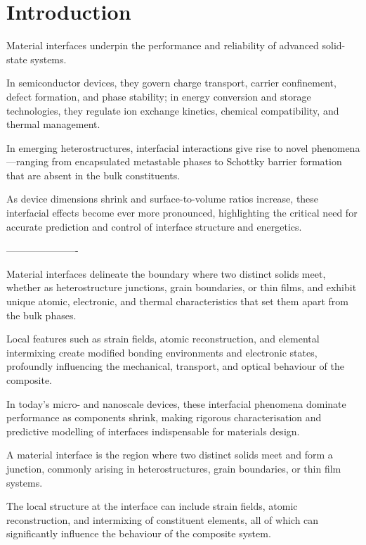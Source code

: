 \chapter{Introduction} \label{chapter:introduction}

\label{para:interface_importance} %

Material interfaces underpin the performance and reliability of advanced solid-state systems.

In semiconductor devices, they govern charge transport, carrier confinement, defect formation, and phase stability; in energy conversion and storage technologies, they regulate ion exchange kinetics, chemical compatibility, and thermal management.

In emerging heterostructures, interfacial interactions give rise to novel phenomena—ranging from encapsulated metastable phases to Schottky barrier formation that are absent in the bulk constituents.

As device dimensions shrink and surface-to-volume ratios increase, these interfacial effects become ever more pronounced, highlighting the critical need for accurate prediction and control of interface structure and energetics.

----------------------

\label{para:interface_foundation} %

Material interfaces delineate the boundary where two distinct solids meet, whether as heterostructure junctions, grain
boundaries, or thin films, and exhibit unique atomic, electronic, and thermal characteristics that set them apart from
the bulk phases.

Local features such as strain fields, atomic reconstruction, and elemental intermixing create modified bonding
environments and electronic states, profoundly influencing the mechanical, transport, and optical behaviour of the
composite.

In today's micro- and nanoscale devices, these interfacial phenomena dominate performance as components shrink, making
rigorous characterisation and predictive modelling of interfaces indispensable for materials design.

\label{para:material_interface_definition} %

A material interface is the region where two distinct solids meet and form a junction, commonly arising in
heterostructures, grain boundaries, or thin film systems.

The local structure at the interface can include strain fields, atomic reconstruction, and intermixing of constituent
elements, all of which can significantly influence the behaviour of the composite system.

